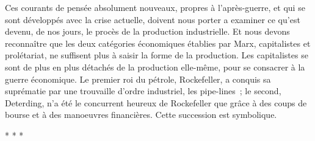 \documentclass[french,twoside]{book} %
\begin{document}
Ces courants de pensée absolument nouveaux, propres à l'après-guerre, et qui se sont développés avec la crise actuelle, doivent nous porter a examiner ce qu'est devenu, de nos jours, le procès de la production industrielle. Et nous devons reconnaître que les deux catégories économiques établies par Marx, capitalistes et prolétariat, ne suffisent plus à saisir la forme de la production. Les capitalistes se sont de plus en plus détachés de la production elle-même, pour se consacrer à la guerre économique. Le premier roi du pétrole, Rockefeller, a conquis sa suprématie par une trouvaille d'ordre industriel, les pipe-lines ; le second, Deterding, n'a été le concurrent heureux de Rockefeller que grâce à des coups de bourse et à des manoeuvres financières. Cette succession est symbolique.\par

\begin{center}
\noindent \centerline{* * *}\par
\end{center}
\end{document}
